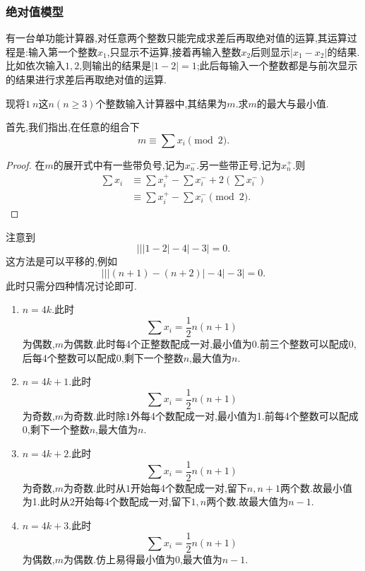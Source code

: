 \subsubsection{绝对值模型}
\begin{problem}
    有一台单功能计算器,对任意两个整数只能完成求差后再取绝对值的运算,其运算过程是:输入第一个整数$x_1$,只显示不运算,接着再输入整数$x_2$后则显示$|x_1-x_2|$的结果.比如依次输入$1,2$,则输出的结果是$|1-2|=1$;此后每输入一个整数都是与前次显示的结果进行求差后再取绝对值的运算.

    现将$1~n$这$n(n\geq 3)$个整数输入计算器中,其结果为$m$.求$m$的最大与最小值.
\end{problem}
\begin{solution}
    首先,我们指出,在任意的组合下\begin{equation}
        m\equiv \sum x_i\pmod2.
    \end{equation}
    \begin{proof}
        在$m$的展开式中有一些带负号,记为$x_n^{-}.$另一些带正号,记为$x_n^{+}.$则
        \begin{align*}
            \sum x_i&\equiv\sum x_i^{+}-\sum x_i^{-}+2\left( \sum x_i^{-} \right)\\
        &\equiv\sum x_i^{+}-\sum x_i^{-}\pmod 2.
        \end{align*}
       
    \end{proof}注意到$$\Bigg|\Big|\big|1-2\big|-4\Big|-3\Bigg|=0.$$
    这方法是可以平移的,例如$$\Bigg|\Big|\big|\left( n+1 \right)-\left( n+2 \right)\big|-4\Big|-3\Bigg|=0.$$
    此时只需分四种情况讨论即可.
    \begin{enumerate}
        \item $n=4k.$此时$$\sum x_i=\dfrac{1}{2}n(n+1)$$为偶数,$m$为偶数.此时每4个正整数配成一对,最小值为0.前三个整数可以配成0,后每4个整数可以配成0,剩下一个整数$n$,最大值为$n$.
        \item $n=4k+1.$此时$$\sum x_i=\dfrac{1}{2}n(n+1)$$为奇数,$m$为奇数.此时除$1$外每4个数配成一对,最小值为1.前每4个整数可以配成0,剩下一个整数$n$,最大值为$n$.
        \item $n=4k+2.$此时$$\sum x_i=\dfrac{1}{2}n(n+1)$$为奇数,$m$为奇数.此时从$1$开始每4个数配成一对,留下$n,n+1$两个数.故最小值为1.此时从$2$开始每4个数配成一对,留下$1,n$两个数.故最大值为$n-1$.
        \item $n=4k+3.$此时$$\sum x_i=\dfrac{1}{2}n(n+1)$$为偶数,$m$为偶数.仿上易得最小值为$0$,最大值为$n-1.$
    \end{enumerate}
\end{solution}
